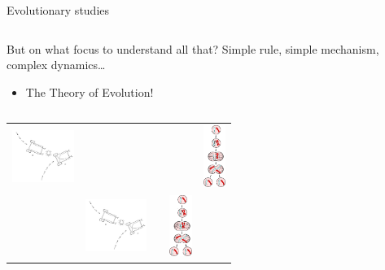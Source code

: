 \documentclass[8pt, handout=show,notes=show]{beamer}
\begin{document}
\begin{frame}{Evolutionary studies}
    \begin{columns}
	\begin{column}{.7\textwidth}
	    \begin{exampleblock}{But on what focus to understand all that?}
		Simple rule, simple mechanism, complex dynamics\ldots\\
		\begin{itemize}
		    \item The Theory of Evolution!
		\end{itemize}

	    \end{exampleblock}
	\end{column}
    \end{columns}

    \begin{table}
	\centering
	\begin{tabular}{ccccc}
	    \includegraphics[width=2cm]{images/braitenberg.jpeg}&&&&\includegraphics[height=2cm]{images/mitosis.png}\\
	    &\includegraphics[width=2cm]{images/braitenberg.jpeg}&&\includegraphics[height=2cm]{images/mitosis.png}&
	    
	\end{tabular}
    \end{table}
    
    
\end{frame}
\end{document}
